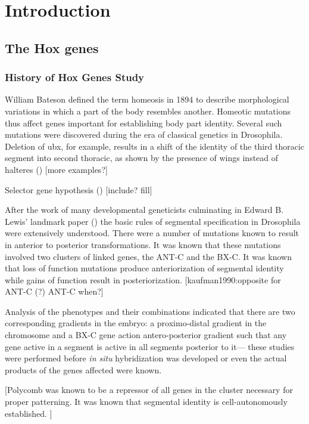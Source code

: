 \chapter{Introduction}


\label{chp:intro}

\section{The Hox genes}

\subsection{History of Hox Genes Study}

William Bateson defined the term homeosis in 1894 to describe morphological variations in which a part of the body resembles another. Homeotic mutations thus affect genes important for establishing body part identity. Several such mutations were discovered during the era of classical genetics in Drosophila. Deletion of \ac{ubx}, for example, results in a shift of the identity of the third thoracic segment into second thoracic, as shown by the presence of wings instead of halteres (\cite{ref}) [more examples?]

Selector gene hypothesis (\cite{Garcia-Bellido1975,Garcia-Bellido1977}) [include? fill]

After the work of many developmental geneticists culminating in Edward B. Lewis' landmark paper (\cite{Lewis1978}) the basic rules of segmental specification in Drosophila were extensively understood. There were a number of mutations known to result in anterior to posterior transformations. It was known that these mutations involved two clusters of linked genes, the \ac{ANT-C} and the \ac{BX-C}. It was known that loss of function mutations produce anteriorization of segmental identity while gains of function result in posteriorization. [kaufman1990:opposite for \ac{ANT-C} (?) \ac{ANT-C} when?]

Analysis of the phenotypes and their combinations indicated that there are two corresponding gradients in the embryo: a proximo-distal gradient in the chromosome and a \ac{BX-C} gene action antero-posterior gradient such that any gene active in a segment is active in all segments posterior to it--- these studies were performed before \textit{in situ} hybridization was developed or even the actual products of the genes affected were known.

[Polycomb was known to be a repressor of all genes in the cluster necessary for proper patterning. It was known that segmental identity is cell-autonomously established. ]

